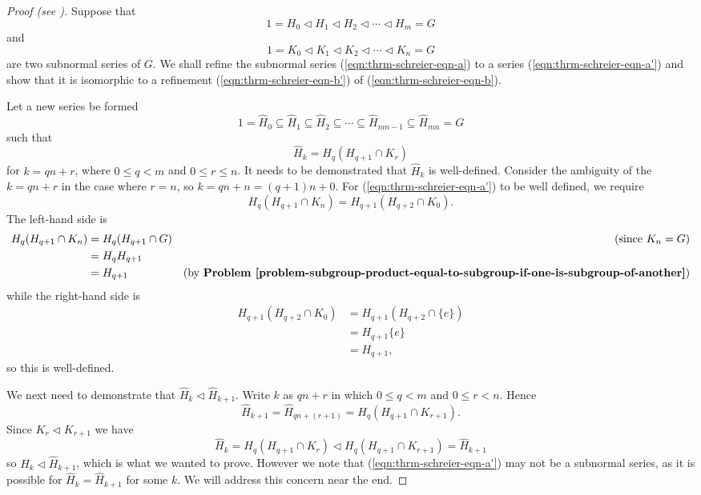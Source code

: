 \begin{proof}[Proof (see {\cite[\S 72]{clark_1984}})]
    Suppose that
    \begin{equation}\label{eqn:thrm-schreier-eqn-a}
        1 = H_0 \lhd H_1 \lhd H_2 \lhd \cdots \lhd H_m = G    
        \tag{A}
    \end{equation}
    and
    \begin{equation}\label{eqn:thrm-schreier-eqn-b}
        1 = K_0 \lhd K_1 \lhd K_2 \lhd \cdots \lhd K_n = G    
        \tag{B}
    \end{equation}
    are two subnormal series of $G$. We shall refine the subnormal series (\ref{eqn:thrm-schreier-eqn-a}) to a series (\ref{eqn:thrm-schreier-eqn-a'}) and show that it is isomorphic to a refinement (\ref{eqn:thrm-schreier-eqn-b'}) of (\ref{eqn:thrm-schreier-eqn-b}).
    
    Let a new series be formed
    \begin{equation}\label{eqn:thrm-schreier-eqn-a'}
        1 = \hat{H}_0 \subseteq \hat{H}_1 \subseteq \hat{H}_2 \subseteq \cdots \subseteq \hat{H}_{mn - 1} \subseteq \hat{H}_{mn} = G
        \tag{A'}
    \end{equation}
    such that
    \[
        \hat{H}_k = H_q(H_{q+1}\cap K_r)
    \]
    for $k = qn + r$, where $0 \leq q < m$ and $0 \leq r \leq n$. It needs to be demonstrated that $\hat{H}_k$ is well-defined. Consider the ambiguity of the $k = qn + r$ in the case where $r = n$, so $k = qn + n = (q+1)n + 0$. For (\ref{eqn:thrm-schreier-eqn-a'}) to be well defined, we require
    \[
        H_q(H_{q+1} \cap K_n) = H_{q+1}(H_{q+2} \cap K_0).
    \]
    The left-hand side is
    \begin{align*}
        H_q(H_{q+1} \cap K_n) &= H_q(H_{q+1} \cap G) & \text{(since } K_n = G)\\
        &= H_qH_{q+1}\\
        &= H_{q+1} & \text{(by \textbf{Problem \ref{problem-subgroup-product-equal-to-subgroup-if-one-is-subgroup-of-another}})}
    \end{align*}
    while the right-hand side is
    \begin{align*}
        H_{q+1}(H_{q+2} \cap K_0) &= H_{q+1}(H_{q+2} \cap \{e\})\\
        &= H_{q+1}\{e\}\\
        &= H_{q+1},
    \end{align*}
    so this is well-defined.
    
    We next need to demonstrate that $\hat{H}_k \lhd \hat{H}_{k+1}$. Write $k$ as $qn+r$ in which $0 \leq q < m$ and $0 \leq r < n$. Hence
    \[
        \hat{H}_{k+1} = \hat{H}_{qn+(r+1)} = H_q(H_{q+1}\cap K_{r+1}). 
    \]
    Since $K_r \lhd K_{r+1}$ we have
    \[
        \hat{H}_k = H_q(H_{q+1}\cap K_r) \lhd H_q(H_{q+1}\cap K_{r+1}) = \hat{H}_{k+1}
    \]
    so $\hat{H}_k \lhd \hat{H}_{k+1}$, which is what we wanted to prove. However we note that (\ref{eqn:thrm-schreier-eqn-a'}) may not be a subnormal series, as it is possible for $\hat{H}_k = \hat{H}_{k+1}$ for some $k$. We will address this concern near the end.
    

\end{proof}
